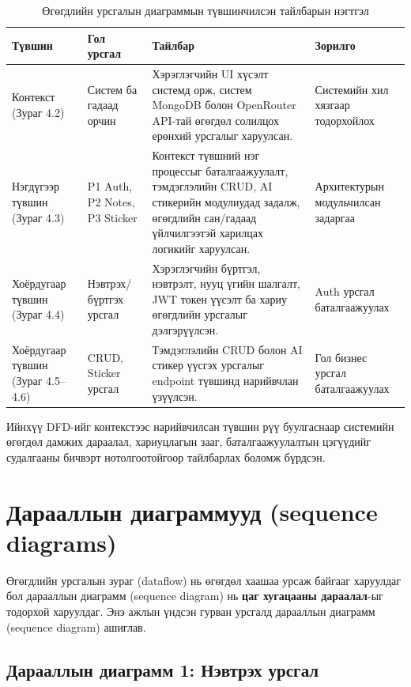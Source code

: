 \begin{table}[H]
\centering
\caption{Өгөгдлийн урсгалын диаграммын түвшинчилсэн тайлбарын нэгтгэл}
\label{tab:dfd_explanation_summary}
\small
\setlength{\tabcolsep}{4pt}
\renewcommand{\arraystretch}{1.15}
\begin{tabularx}{\textwidth}{>{\raggedright\arraybackslash}p{2.2cm}>{\raggedright\arraybackslash}p{3.2cm}>{\raggedright\arraybackslash}X>{\raggedright\arraybackslash}p{2.4cm}}
\toprule
\textbf{Түвшин} & \textbf{Гол урсгал} & \textbf{Тайлбар} & \textbf{Зорилго} \\
\midrule
Контекст (Зураг 4.2) & Систем ба гадаад орчин & Хэрэглэгчийн UI хүсэлт системд орж, систем MongoDB болон OpenRouter API-тай өгөгдөл солилцох ерөнхий урсгалыг харуулсан. & Системийн хил хязгаар тодорхойлох \\
Нэгдүгээр түвшин (Зураг 4.3) & P1 Auth, P2 Notes, P3 Sticker & Контекст түвшний нэг процессыг баталгаажуулалт, тэмдэглэлийн CRUD, AI стикерийн модулиудад задалж, өгөгдлийн сан/гадаад үйлчилгээтэй харилцах логикийг харуулсан. & Архитектурын модульчилсан задаргаа \\
Хоёрдугаар түвшин (Зураг 4.4) & Нэвтрэх/бүртгэх урсгал & Хэрэглэгчийн бүртгэл, нэвтрэлт, нууц үгийн шалгалт, JWT токен үүсэлт ба хариу өгөгдлийн урсгалыг дэлгэрүүлсэн. & Auth урсгал баталгаажуулах \\
Хоёрдугаар түвшин (Зураг 4.5--4.6) & CRUD, Sticker урсгал & Тэмдэглэлийн CRUD болон AI стикер үүсгэх урсгалыг endpoint түвшинд нарийвчлан үзүүлсэн. & Гол бизнес урсгал баталгаажуулах \\
\bottomrule
\end{tabularx}
\normalsize
\end{table}

Ийнхүү DFD-ийг контекстээс нарийвчилсан түвшин рүү буулгаснаар системийн өгөгдөл дамжих дараалал, хариуцлагын зааг, баталгаажуулалтын цэгүүдийг судалгааны бичвэрт нотолгоотойгоор тайлбарлах боломж бүрдсэн.

\section{Дарааллын диаграммууд (sequence diagrams)}

Өгөгдлийн урсгалын зураг (dataflow) нь өгөгдөл хаашаа урсаж байгааг харуулдаг бол дарааллын диаграмм (sequence diagram) нь \textbf{цаг хугацааны дараалал}-ыг тодорхой харуулдаг. Энэ ажлын үндсэн гурван урсгалд дарааллын диаграмм (sequence diagram) ашиглав.

\subsection{Дарааллын диаграмм 1: Нэвтрэх урсгал}

